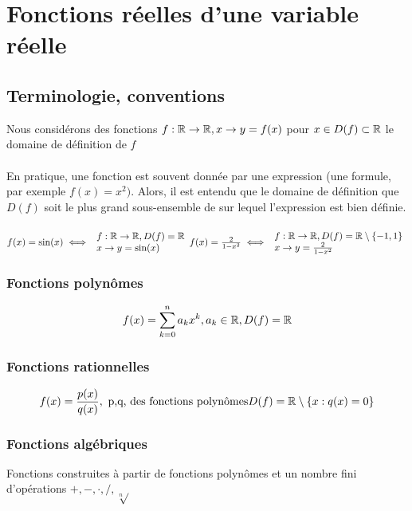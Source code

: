 \documentclass[12pt,a4paper]{article}
\begin{document}
{\section{Fonctions réelles d'une variable réelle}
\setcounter{equation}{0}
\subsection{Terminologie, conventions}
Nous considérons des fonctions $f:\rtor, x \to y = f(x)$ pour $x \in D(f) \subset \R$ le domaine de définition de $f$\\
\\
En pratique, une fonction est souvent donnée par une expression (une formule, par exemple $f(x) = x^2)$. Alors, il est entendu que le domaine de définition que $D(f)$ soit le plus grand sous-ensemble de \R sur lequel l'expression est bien définie.\\
\\
$f(x) = \sin(x) \iff \begin{array}{l}
f:\rtor, D(f)	 = \R\\
x \to y = \sin(x)
\end{array}\\
f(x) = \frac{2}{1-x^2} \iff \begin{array}{l}
f:\rtor, D(f) = \R\setminus\{-1,1\}\\
x\to y = \frac{2}{1-x^2}
\end{array}$
\subsubsection{Fonctions polynômes}
\begin{equation}
	f(x) = \somme{n}{k = 0}a_k x^k, a_k \in \R, D(f) = \R
\end{equation}

\subsubsection{Fonctions rationnelles}
\begin{equation}
f(x) = \frac{p(x)}{q(x)}, \mbox{ p,q, des fonctions polynômes}\\
D(f) = \R\setminus\{x : q(x) = 0\}
\end{equation}

\subsubsection{Fonctions algébriques}
Fonctions construites à partir de fonctions polynômes et un nombre fini d'opérations $+,-,\cdot,/,\sqrt[n]{}$

}
\end{document}
